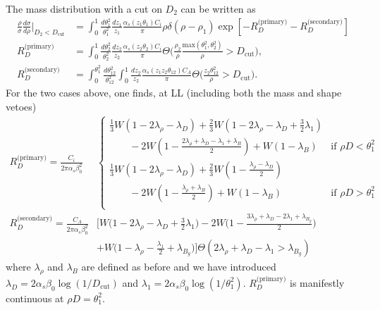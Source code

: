 The mass distribution with a cut on $D_2$ can be written as 
\begin{align}
  \frac{\rho}{\sigma} \frac{d\sigma}{d\rho}\Big|_{D_2<D_\text{cut}}
  & = \int_0^1 \frac{d\theta_1^2}{\theta_1^2}\frac{dz_1}{z_1}
      \frac{\alpha_s(z_1\theta_1)C_i}{\pi}\rho\delta(\rho-\rho_1)
      \exp[-R_D^\text{(primary)}-R_D^\text{(secondary)}]\label{eq:D2-plain-mass}\\
  R_D^\text{(primary)}
    & =  \int_0^1 \frac{d\theta_2^2}{\theta_2^2}\frac{dz_2}{z_2}
      \frac{\alpha_s(z_2\theta_2)C_i}{\pi}\Theta\Big(\frac{\rho_2}{\rho} \frac{\text{max}(\theta_1^2,\theta_2^2)}{\rho}>D_\text{cut}\Big)\label{eq:D2-plain-Rprimary},\\
  R_D^\text{(secondary)}
    & = \int_0^{\theta_1^2} \frac{d\theta_{12}^2}{\theta_{12}^2}\int_0^1\frac{dz_2}{z_2} \frac{\alpha_s(z_1z_2\theta_{12})C_A}{\pi}\Theta\Big(\frac{z_2\theta_{12}^2}{\rho}>D_\text{cut}\Big).\label{eq:D2-plain-Rsecondary}
\end{align}
For the two cases above, one finds, at LL (including both the
mass and shape vetoes)
\begin{align}
  R_D^\text{(primary)} = \frac{C_i}{2\pi\alpha_s\beta_0^2}
    & \begin{cases}
    \frac{1}{3} W(1-2\lambda_\rho-\lambda_D)
    +\frac{2}{3} W(1-2\lambda_\rho-\lambda_D+\frac{3}{2}\lambda_1)\\
    \qquad -2 W(1-\frac{2\lambda_\rho+\lambda_D-\lambda_1+\lambda_B}{2})
    + W(1-\lambda_B) & \text{if }\rho D<\theta_1^2\\
    \frac{1}{3} W(1-2\lambda_\rho-\lambda_D)
    +\frac{2}{3} W(1-\frac{\lambda_\rho-\lambda_D}{2})\\
    \qquad -2 W(1-\frac{\lambda_\rho+\lambda_B}{2})
    + W(1-\lambda_B) & \text{if }\rho D>\theta_1^2\\    
  \end{cases}\\
  R_D^\text{(secondary)} = \frac{C_A}{2\pi\alpha_s\beta_0^2} &
  \bigg[                                                              
     W\Big(1-2\lambda_\rho-\lambda_D+\frac{3}{2}\lambda_1\Big)
    -2 W\Big(1-\frac{3\lambda_\rho+\lambda_D-2\lambda_1+\lambda_{B_g}}{2}\Big)\nonumber\\
    & + W\Big(1-\lambda_\rho-\frac{\lambda_1}{2}+\lambda_{B_g}\Big)\bigg]
      \Theta(2\lambda_\rho+\lambda_D-\lambda_1>\lambda_{B_g})
\end{align}
where $\lambda_\rho$ and $\lambda_B$ are defined as before and we have
introduced $\lambda_D=2\alpha_s\beta_0\log(1/D_\text{cut})$ and
$\lambda_1=2\alpha_s\beta_0\log(1/\theta_1^2)$.
%
$R_D^\text{(primary)}$ is manifestly continuous at $\rho D=\theta_1^2$.

